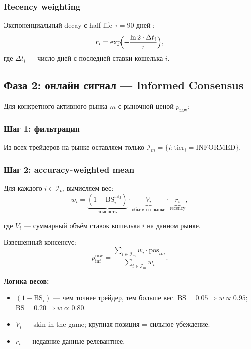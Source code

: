 \documentclass[a4paper, 11pt]{article}
\newcommand{\bs}{\mathrm{BS}}
\begin{document}
\subsubsection{Recency weighting}

Экспоненциальный decay с half-life $\tau = 90$ дней
\citep{burgi2025kalshi}:
\begin{equation}
\label{eq:recency}
r_i = \exp\!\Bigl(-\frac{\ln 2 \cdot \Delta t_i}{\tau}\Bigr),
\end{equation}
где $\Delta t_i$ --- число дней с последней ставки кошелька $i$.

\subsection{Фаза 2: онлайн сигнал --- Informed Consensus}

Для конкретного активного рынка $m$ с рыночной ценой $p_{\mathrm{raw}}$:

\subsubsection{Шаг 1: фильтрация}

Из всех трейдеров на рынке оставляем только $\mathcal{I}_m = \{i : \mathrm{tier}_i = \text{INFORMED}\}$.

\subsubsection{Шаг 2: accuracy-weighted mean}

Для каждого $i \in \mathcal{I}_m$ вычисляем вес:
\begin{equation}
\label{eq:weight}
w_i = \underbrace{(1 - \bs_i^{\mathrm{adj}})}_{\text{точность}} \cdot
      \underbrace{V_i}_{\text{объём на рынке}} \cdot
      \underbrace{r_i}_{\text{recency}},
\end{equation}

где $V_i$ --- суммарный объём ставок кошелька $i$ на данном рынке.

Взвешенный консенсус:
\begin{equation}
\label{eq:informed_raw}
p_{\mathrm{inf}}^{\mathrm{raw}} = \frac{\sum_{i \in \mathcal{I}_m} w_i \cdot \mathrm{pos}_{im}}{\sum_{i \in \mathcal{I}_m} w_i}.
\end{equation}

\textbf{Логика весов:}
\begin{itemize}[nosep]
  \item $(1 - \bs_i)$ --- чем точнее трейдер, тем больше вес.
    $\bs = 0.05 \Rightarrow w \propto 0.95$; $\bs = 0.20 \Rightarrow w \propto 0.80$.
  \item $V_i$ --- skin in the game; крупная позиция = сильное убеждение.
  \item $r_i$ --- недавние данные релевантнее.
\end{itemize}
\end{document}
